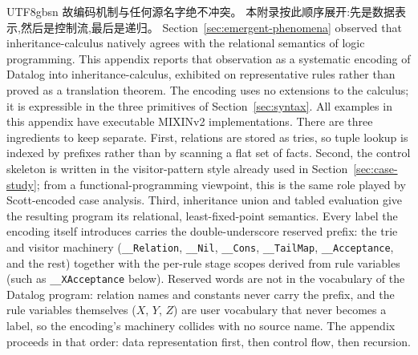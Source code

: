 \begin{CJK*}{UTF8}{gbsn}
故编码机制与任何源名字绝不冲突。
本附录按此顺序展开:先是数据表示,然后是控制流,最后是递归。
\else
Section~\ref{sec:emergent-phenomena} observed that
inheritance-calculus natively agrees with the relational semantics
of logic programming.
This appendix reports that observation as a systematic
encoding of Datalog into inheritance-calculus, exhibited on
representative rules rather than proved as a translation theorem.
The encoding uses no extensions to the calculus; it is
expressible in the three primitives of Section~\ref{sec:syntax}.
All examples in this appendix have executable MIXINv2
implementations.
There are three ingredients to keep separate.
First, relations are stored as tries, so tuple lookup is indexed
by prefixes rather than by scanning a flat set of facts.
Second, the control skeleton is written in the visitor-pattern
style already used in Section~\ref{sec:case-study}; from a
functional-programming viewpoint, this is the same role played by
Scott-encoded case analysis.
Third, inheritance union and tabled evaluation give the resulting
program its relational, least-fixed-point semantics.
Every label the encoding itself introduces carries the
double-underscore reserved prefix: the trie and visitor machinery
(\texttt{__Relation}, \texttt{__Nil},
\texttt{__Cons}, \texttt{__TailMap},
\texttt{__Acceptance}, and the rest) together with the
per-rule stage scopes derived from rule variables (such as
\texttt{__XAcceptance} below). Reserved words are not in
the vocabulary of the Datalog program: relation names and constants
never carry the prefix, and the rule variables themselves ($X$,
$Y$, $Z$) are user vocabulary that never becomes a label, so the
encoding's machinery collides with no source name.
The appendix proceeds in that order: data representation first,
then control flow, then recursion.
\fi

\subsection{}


\end{CJK*}
